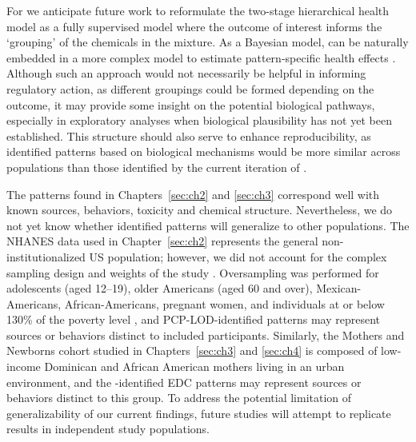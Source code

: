For \bnmf we anticipate future work to reformulate the two-stage hierarchical health model as a fully supervised model where the outcome of interest informs the `grouping' of the chemicals in the mixture. As a Bayesian model, \bnmf can be naturally embedded in a more complex model to estimate pattern-specific health effects \citep{bda3}. Although such an approach would not necessarily be helpful in informing regulatory action, as different groupings could be formed depending on the outcome, it may provide some insight on the potential biological pathways, especially in exploratory analyses when biological plausibility has not yet been established. This structure should also serve to enhance reproducibility, as identified patterns based on biological mechanisms would be more similar across populations than those identified by the current iteration of \bnmfc.

The patterns found in Chapters~\ref{sec:ch2} and \ref{sec:ch3} correspond well with known sources, behaviors, toxicity and chemical structure. Nevertheless, we do not yet know whether identified patterns will generalize to other populations. The NHANES data used in Chapter~\ref{sec:ch2} represents the general non-institutionalized US population; however, we did not account for the complex sampling design and weights of the study \citep{johnson2013national}. Oversampling was performed for adolescents (aged 12–19), older Americans (aged 60 and over), Mexican-Americans, African-Americans, pregnant women, and individuals at or below 130\% of the poverty level \citep{curtin2012national}, and PCP-LOD-identified patterns may represent sources or behaviors distinct to included participants. Similarly, the Mothers and Newborns cohort studied in Chapters~\ref{sec:ch3} and \ref{sec:ch4} is composed of low-income Dominican and African American mothers living in an urban environment, and the \bnmfc-identified EDC patterns may represent sources or behaviors distinct to this group. To address the potential limitation of generalizability of our current findings, future studies will attempt to replicate results in independent study populations.


